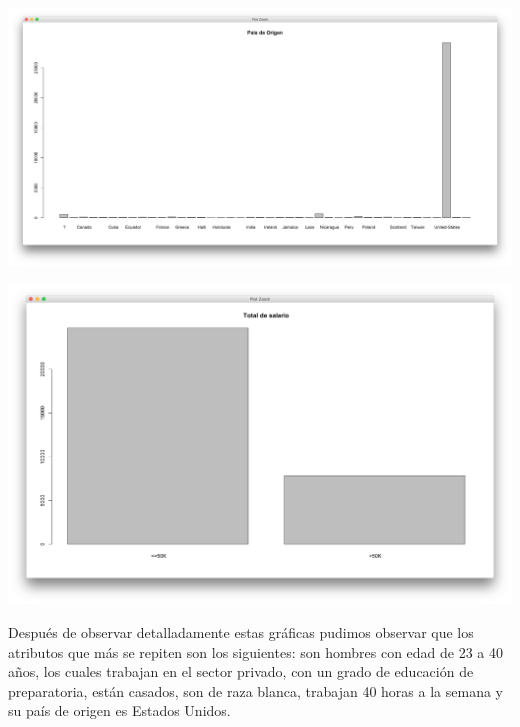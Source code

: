 \documentclass{article}
\begin{document}
 \begin{center}
   \hbox{\hspace{-5.8em}\includegraphics[scale=0.33]{graficas/paisDeOrigen}}
 \end{center}
 \begin{center}
   \hbox{\hspace{-5.8em}\includegraphics[scale=0.4]{graficas/totalDeSalario}}
 \end{center}

 Después de observar detalladamente estas gráficas pudimos observar que los atributos que más se repiten son los siguientes: son hombres con edad de 23 a 40 años, los cuales trabajan en el sector privado, con un grado de educación de preparatoria, están casados, son de raza blanca, trabajan 40 horas a la semana y su país de origen es Estados Unidos.
\end{document}
